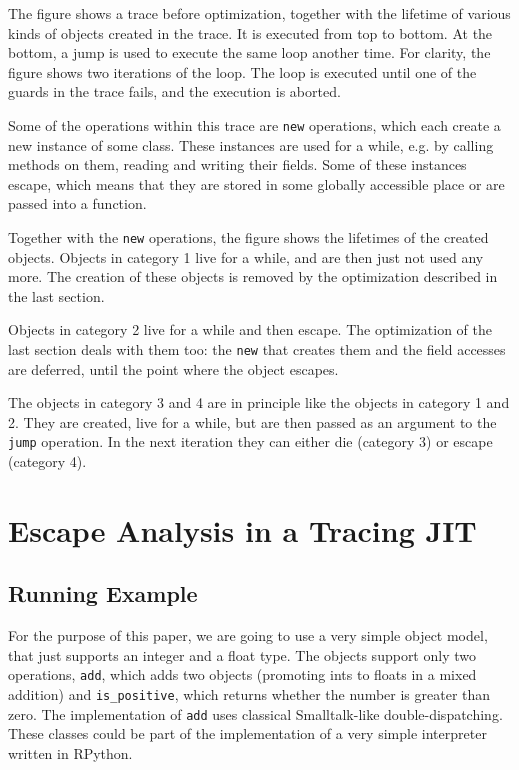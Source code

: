 \documentclass{sigplanconf}
\begin{document}
The figure shows a trace before optimization, together with the lifetime of
various kinds of objects created in the trace. It is executed from top to
bottom. At the bottom, a jump is used to execute the same loop another time.
For clarity, the figure shows two iterations of the loop.
The loop is executed until one of the guards in the trace fails, and the
execution is aborted.

Some of the operations within this trace are \texttt{new} operations, which each create a
new instance of some class. These instances are used for a while, e.g. by
calling methods on them, reading and writing their fields. Some of these
instances escape, which means that they are stored in some globally accessible
place or are passed into a function.

Together with the \texttt{new} operations, the figure shows the lifetimes of the
created objects. Objects in category 1 live for a while, and are then just not
used any more. The creation of these objects is removed by the
optimization described in the last section.

Objects in category 2 live for a while and then escape. The optimization of the
last section deals with them too: the \texttt{new} that creates them and
the field accesses are deferred, until the point where the object escapes.

The objects in category 3 and 4 are in principle like the objects in category 1
and 2. They are created, live for a while, but are then passed as an argument
to the \texttt{jump} operation. In the next iteration they can either die (category
3) or escape (category 4).

\section{Escape Analysis in a Tracing JIT}
\label{sec:virtuals}

\subsection{Running Example}

For the purpose of this paper, we are going to use a very simple object
model, that just supports an integer and a float type. The objects support only
two operations, \texttt{add}, which adds two objects (promoting ints to floats in a
mixed addition) and \texttt{is\_positive}, which returns whether the number is greater
than zero. The implementation of \texttt{add} uses classical Smalltalk-like
double-dispatching. These classes could be part of the implementation of a very
simple interpreter written in RPython.
\end{document}

